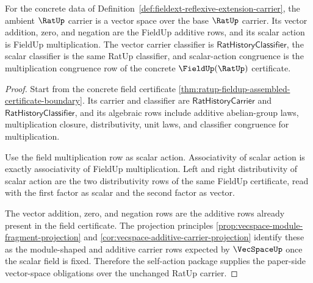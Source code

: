 \begin{theorem}
\label{thm:fieldext-reflexive-vector-space-package}
For the concrete data of
Definition~\ref{def:fieldext-reflexive-extension-carrier}, the ambient
$\RatUp$ carrier is a vector space over the base $\RatUp$ carrier. Its vector
addition, zero, and negation are the FieldUp additive rows, and its scalar
action is FieldUp multiplication. The vector carrier classifier is
$\mathsf{RatHistoryClassifier}$, the scalar classifier is the same RatUp
classifier, and scalar-action congruence is the multiplication congruence row
of the concrete $\FieldUp(\RatUp)$ certificate.
\end{theorem}
\begin{proof}
Start from the concrete field certificate
\autoref{thm:ratup-fieldup-assembled-certificate-boundary}. Its carrier and
classifier are $\mathsf{RatHistoryCarrier}$ and
$\mathsf{RatHistoryClassifier}$, and its algebraic rows include additive
abelian-group laws, multiplication closure, distributivity, unit laws, and
classifier congruence for multiplication.

Use the field multiplication row as scalar action. Associativity of scalar
action is exactly associativity of FieldUp multiplication. Left and right
distributivity of scalar action are the two distributivity rows of the same
FieldUp certificate, read with the first factor as scalar and the second
factor as vector.

The vector addition, zero, and negation rows are the additive rows already
present in the field certificate. The projection principles
\autoref{prop:vecspace-module-fragment-projection} and
\autoref{cor:vecspace-additive-carrier-projection} identify these as the
module-shaped and additive carrier rows expected by $\VecSpaceUp$ once the
scalar field is fixed. Therefore the self-action package supplies the
paper-side vector-space obligations over the unchanged RatUp carrier.
\end{proof}

